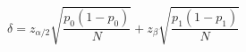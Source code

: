 \documentclass[12pt]{article}
\begin{document}
\pagestyle{empty}
\large

\[
\delta = z_{\alpha/2} \sqrt{\frac{p_0(1 - p_0)}{N}} +
         z_{\beta} \sqrt{\frac{p_1(1 - p_1)}{N}}
\]
\end{document}
